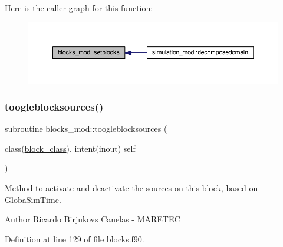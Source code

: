 Here is the caller graph for this function\+:
\nopagebreak
\begin{figure}[H]
\begin{center}
\leavevmode
\includegraphics[width=350pt]{namespaceblocks__mod_a8f5a5d9e6cfd16cfd1b179092a204696_icgraph}
\end{center}
\end{figure}
\mbox{\label{namespaceblocks__mod_ab9e57cbf0103b632b2b2dfa4e4d4139c}} 
\subsubsection{\texorpdfstring{toogleblocksources()}{toogleblocksources()}}
{\footnotesize\ttfamily subroutine blocks\+\_\+mod\+::toogleblocksources (\begin{DoxyParamCaption}\item[{class(\mbox{\hyperlink{structblocks__mod_1_1block__class}{block\+\_\+class}}), intent(inout)}]{self }\end{DoxyParamCaption})\hspace{0.3cm}{\ttfamily [private]}}



Method to activate and deactivate the sources on this block, based on GlobaSim\+Time. 

\begin{DoxyAuthor}{Author}
Ricardo Birjukovs Canelas -\/ M\+A\+R\+E\+T\+EC 
\end{DoxyAuthor}


Definition at line 129 of file blocks.\+f90.


